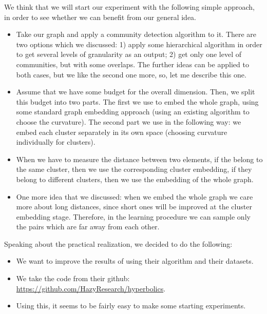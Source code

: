 \documentclass{article}
\begin{document}
We think that we will start our experiment with the following simple approach, in order to see whether we can benefit from our general idea.

\begin{itemize}
    \item Take our graph and apply a community detection algorithm to it. There are two options which we discussed: 1) apply some hierarchical algorithm in order to get several levels of granularity as an output; 2) get only one level of communities, but with some overlaps. The further ideas can be applied to both cases, but we like the second one more, so, let me describe this one. 
    \item Assume that we have some budget for the overall dimension. Then, we split this budget into two parts. The first we use to embed the whole graph, using some standard graph embedding approach (using an existing algorithm to choose the curvature). The second part we use in the following way: we embed each cluster separately in its own space (choosing curvature individually for clusters).
    \item When we have to measure the distance between two elements, if the belong to the same cluster, then we use the corresponding cluster embedding, if they belong to different clusters, then we use the embedding of the whole graph.
    \item One more idea that we discussed: when we embed the whole graph we care more about long distances, since short ones will be improved at the cluster embedding stage. Therefore, in the learning procedure we can sample only the pairs which are far away from each other.
\end{itemize}

Speaking about the practical realization, we decided to do the following: 
\begin{itemize}
    \item We want to improve the results of \cite{gu2019learning} using their algorithm and their datasets.
    \item We take the code from their github: \url{https://github.com/HazyResearch/hyperbolics}.
    \item Using this, it seems to be fairly easy to make some starting experiments.
\end{itemize}
\end{document}
